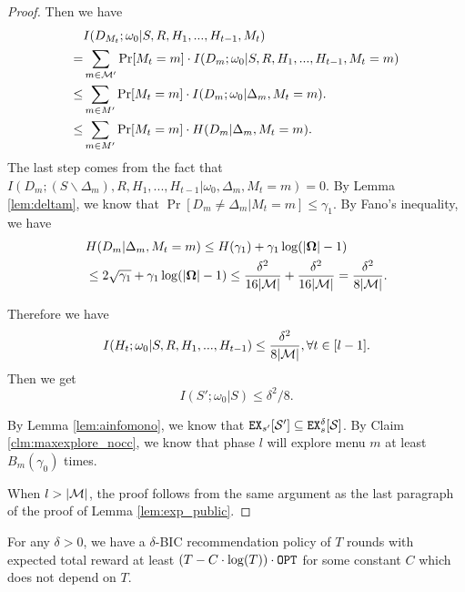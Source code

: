 \begin{proof}
Then we have
\begin{align*}
& I(D_{M_t}; \omega_0|S,R,H_1,...,H_{t-1},M_t)\\
=& \sum_{m \in \mathcal{M}'} \Pr[M_t = m] \cdot I(D_m;\omega_0 | S,R,H_1,...,H_{t-1},M_t = m)\\
\leq& \sum_{m \in M'} \Pr[M_t = m] \cdot I(D_m;\omega_0| \Delta_m, M_t =m).\\
\leq& \sum_{m \in M'} \Pr[M_t = m] \cdot H(D_m| \Delta_m, M_t =m).
\end{align*}
The last step comes from the fact that \\$I(D_m; (S\backslash \Delta_m),R,H_1,...,H_{t-1}|\omega_0, \Delta_m, M_t =m) = 0$. By Lemma \ref{lem:deltam}, we know that $\Pr[D_m \neq \Delta_m|M_t = m] \leq \gamma_1$. By Fano's inequality, we have
\begin{align*}
&H(D_m| \Delta_m, M_t =m) \leq H(\gamma_1) + \gamma_1 \log(|\bold{\Omega}| - 1) \\
&\leq 2\sqrt{\gamma_1} + \gamma_1 \log(|\bold{\Omega}| - 1) \leq \frac{\delta^2}{16|\mathcal{M}|}+\frac{\delta^2}{16|\mathcal{M}|}  = \frac{\delta^2}{8|\mathcal{M}|}.
\end{align*}

Therefore we have
\[
I(H_t; \omega_0|S,R,H_1,...,H_{t-1}) \leq \frac{\delta^2}{8|\mathcal{M}|}, \forall t \in [l-1].
\]
Then we get
\[
I(S'; \omega_0 | S) \leq \delta^2/8.
\]

By Lemma \ref{lem:ainfomono}, we know that $\mathtt{EX}_{s'}[\mathcal{S}'] \subseteq \mathtt{EX}^{\delta}_s[\mathcal{S}]$. By Claim \ref{clm:maxexplore_nocc}, we know that phase $l$ will explore menu $m$ at least $B_m(\gamma_0)$ times.

When $l > |\mathcal{M}|$, the proof follows from the same argument as the last paragraph of the proof of Lemma \ref{lem:exp_public}.
\end{proof}

\begin{corollary}
\label{cor:private_nocc}
For any $\delta > 0$, we have a $\delta$-BIC recommendation policy of $T$ rounds with expected total reward at least $\left(T - C\cdot \log(T) \right) \cdot \mathtt{OPT}$ for some constant $C$ which does not depend on $T$.
\end{corollary}

